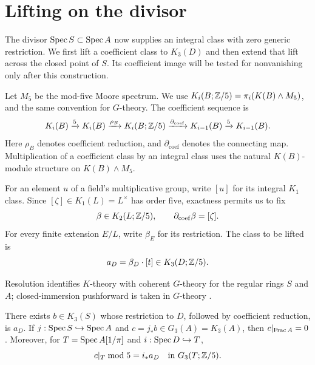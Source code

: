 \section{Lifting on the divisor}\label{sec:integral}

The divisor $\operatorname{Spec} S\subset\operatorname{Spec} A$ now supplies an integral class
with zero generic restriction. We first lift a coefficient class
to $K_3(D)$ and then extend that lift across the closed point of $S$.
Its coefficient image will be tested for nonvanishing only after
this construction.

Let $M_5$ be the mod-five Moore spectrum. We use
$K_i(B;\mathbb Z/5)=\pi_i(K(B)\wedge M_5)$, and the same convention for
$G$-theory. The coefficient sequence is
\begin{equation}\label{eq:coeff}
 K_i(B)\xrightarrow{5}K_i(B)\xrightarrow{\rho_B}K_i(B;\mathbb Z/5)
 \xrightarrow{\partial_{\mathrm{coef}}}K_{i-1}(B)
 \xrightarrow{5}K_{i-1}(B).
\end{equation}
Here $\rho_B$ denotes coefficient reduction, and
$\partial_{\mathrm{coef}}$ denotes the connecting map.
Multiplication of a coefficient class by an integral class uses
the natural $K(B)$-module structure on $K(B)\wedge M_5$.

For an element $u$ of a field's multiplicative group, write $[u]$
for its integral $K_1$ class. Since
$[\zeta]\in K_1(L)=L^\times$ has order five, exactness permits
us to fix
\[
 \beta\in K_2(L;\mathbb Z/5),\qquad
 \partial_{\mathrm{coef}}\beta=[\zeta].
\]
For every finite extension $E/L$, write $\beta_E$ for its restriction.
The class to be lifted is
\[
 a_D=\beta_D\cdot[t]\in K_3(D;\mathbb Z/5).
\]

Resolution identifies $K$-theory with coherent
$G$-theory for the regular rings $S$ and $A$; closed-immersion
pushforward is taken in $G$-theory
\cite[\S7.1 and \S7, paragraph 2.7 and the discussion following (2.8)]{QuillenHigher}.

\begin{proposition}\label{prop:integral}
There exists $b\in K_3(S)$ whose restriction to $D$, followed
by coefficient reduction, is $a_D$. If
$j:\operatorname{Spec} S\hookrightarrow\operatorname{Spec} A$ and $c=j_*b\in G_3(A)=K_3(A)$,
then $c|_{\operatorname{Frac} A}=0$. Moreover, for
$T=\operatorname{Spec} A[1/\pi]$ and $i:\operatorname{Spec} D\hookrightarrow T$,
\[
 c|_T\bmod5=i_*a_D\quad\text{in }G_3(T;\mathbb Z/5).
\]
\end{proposition}

